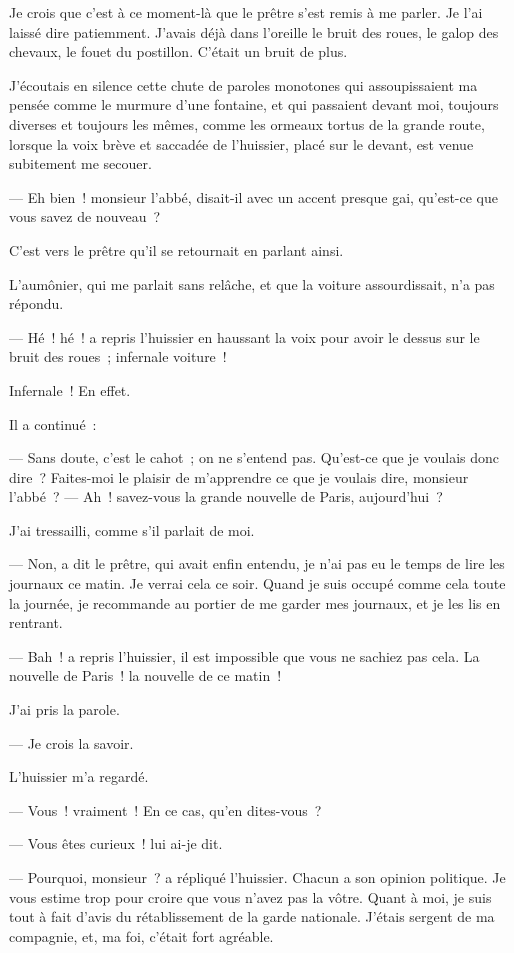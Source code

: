 \documentclass[french,twoside]{book} %
\begin{document}
Je crois que c’est à ce moment-là que le prêtre s’est remis à me parler. Je l’ai laissé dire patiemment. J’avais déjà dans l’oreille le bruit des roues, le galop des chevaux, le fouet du postillon. C’était un bruit de plus.\par
J’écoutais en silence cette chute de paroles monotones qui assoupissaient ma pensée comme le murmure d’une fontaine, et qui passaient devant moi, toujours diverses et toujours les mêmes, comme les ormeaux tortus de la grande route, lorsque la voix brève et saccadée de l’huissier, placé sur le devant, est venue subitement me secouer.\par
 — Eh bien ! monsieur l’abbé, disait-il avec un accent presque gai, qu’est-ce que vous savez de nouveau ?\par
C’est vers le prêtre qu’il se retournait en parlant ainsi.\par
L’aumônier, qui me parlait sans relâche, et que la voiture assourdissait, n’a pas répondu.\par
— Hé ! hé ! a repris l’huissier en haussant la voix pour avoir le dessus sur le bruit des roues ; infernale voiture !\par
Infernale ! En effet.\par
Il a continué :\par
— Sans doute, c’est le cahot ; on ne s’entend pas. Qu’est-ce que je voulais donc dire ? Faites-moi le plaisir de m’apprendre ce que je voulais dire, monsieur l’abbé ? — Ah ! savez-vous la grande nouvelle de Paris, aujourd’hui ?\par
J’ai tressailli, comme s’il parlait de moi.\par
— Non, a dit le prêtre, qui avait enfin entendu, je n’ai pas eu le temps de lire les journaux ce matin. Je verrai cela ce soir. Quand je suis occupé comme cela toute la journée, je recommande au portier de me garder mes journaux, et je les lis en rentrant.\par
— Bah ! a repris l’huissier, il est impossible que vous ne sachiez pas cela. La nouvelle de Paris ! la nouvelle de ce matin !\par
J’ai pris la parole.\par
— Je crois la savoir.\par
L’huissier m’a regardé.\par
— Vous ! vraiment ! En ce cas, qu’en dites-vous ?\par
 — Vous êtes curieux ! lui ai-je dit.\par
— Pourquoi, monsieur ? a répliqué l’huissier. Chacun a son opinion politique. Je vous estime trop pour croire que vous n’avez pas la vôtre. Quant à moi, je suis tout à fait d’avis du rétablissement de la garde nationale. J’étais sergent de ma compagnie, et, ma foi, c’était fort agréable.\par
\end{document}
